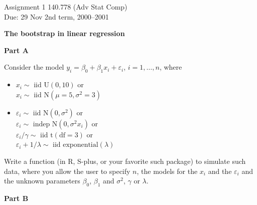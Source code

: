 \documentclass[]{article}
\newcommand{\hsp}{\hspace*{0.2cm}}
\begin{document}
{ \large
Assignment 1 \hfill 140.778 (Adv Stat Comp)
\\
Due: 29 Nov \hfill 2nd term, 2000--2001 }

\bigskip \bigskip

{\large \textbf{The bootstrap in linear regression}}

\bigskip 

\textbf{Part A}

\smallskip

Consider the model $y_i = \beta_0 + \beta_1 x_i + \varepsilon_i$, $i = 1,
\ldots, n$, where 
\begin{itemize}
  \item $x_i \sim \text{ iid U}(0,10)$ \hsp or \\
      $x_i \sim \text{ iid N}(\mu=5, \sigma^2=3)$
  \item $\varepsilon_i \sim \text{ iid N}(0, \sigma^2)$ \hsp or \\
        $\varepsilon_i \sim \text{ indep N}(0, \sigma^2x_i)$ \hsp or \\
        $\varepsilon_i/\gamma \sim \text{ iid t}(\text{df} = 3)$ \hsp or \\
        $\varepsilon_i + 1/\lambda \sim \text{ iid exponential}(\lambda)$
\end{itemize}

Write a function (in R, S-plus, or your favorite such package) to
simulate such data, where you allow the user to specify $n$, the
models for the $x_i$ and the $\varepsilon_i$ and the unknown
parameters $\beta_0$, $\beta_1$ and $\sigma^2$, $\gamma$ or
$\lambda$.  

\bigskip

\textbf{Part B}

\smallskip
\end{document}
